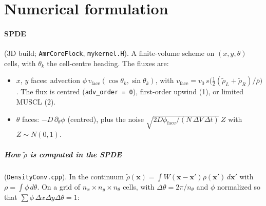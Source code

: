 \documentclass[11pt]{article}
\newcommand{\code}[1]{\texttt{#1}}
\newcommand{\rt}{\tilde\rho}
\newcommand{\rb}{\bar\rho}
\begin{document}
\section{Numerical formulation}

\paragraph{SPDE} (3D build; \code{AmrCoreFlock}, \code{mykernel.H}). A
finite-volume scheme on $(x,y,\theta)$ cells, with $\theta_k$ the cell-centre
heading. The fluxes are:
\begin{itemize}
  \item $x$, $y$ faces: advection $\phi\,v_{\mathrm{face}}(\cos\theta_k,\sin\theta_k)$,
        with $v_{\mathrm{face}} = v_0\,s\bigl(\tfrac12(\rt_L+\rt_R)/\rb\bigr)$.
        The flux is centred (\code{adv\_order = 0}), first-order upwind (1),
        or limited MUSCL (2).
  \item $\theta$ faces: $-D\,\partial_\theta\phi$ (centred), plus the noise
        $\sqrt{2D\phi_{\mathrm{face}}/(N\,\Delta V\,\Delta t)}\,Z$ with
        $Z\sim N(0,1)$.
\end{itemize}
\subparagraph{How $\rt$ is computed in the SPDE} (\code{DensityConv.cpp}).
In the continuum $\rt(\mathbf x)=\int W(\mathbf x-\mathbf x')\rho(\mathbf x')\,d\mathbf x'$
with $\rho=\int\phi\,d\theta$. On a grid of $n_x\times n_y\times n_\theta$ cells,
with $\Delta\theta=2\pi/n_\theta$ and $\phi$ normalized so that
$\sum\phi\,\Delta x\Delta y\Delta\theta=1$:
\end{document}
